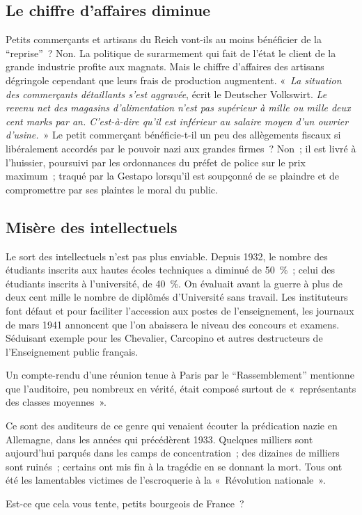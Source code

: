 \documentclass[french,twoside]{book} %
\begin{document}
\subsection[Le chiffre d’affaires diminue]{Le chiffre d’affaires diminue}
\noindent Petits commerçants et artisans du Reich vont-ils au moins bénéficier de la “reprise” ? Non. La politique de surarmement qui fait de l’état le client de la grande industrie profite aux magnats. Mais le chiffre d’affaires des artisans dégringole cependant que leurs frais de production augmentent. « \emph{La situation des commerçants détaillants s’est aggravée}, écrit le Deutscher Volkswirt. \emph{Le revenu net des magasins d’alimentation n’est pas supérieur à mille ou mille deux cent marks par an. C’est-à-dire qu’il est inférieur au salaire moyen d’un ouvrier d’usine.} » Le petit commerçant bénéficie-t-il un peu des allègements fiscaux si libéralement accordés par le pouvoir nazi aux grandes firmes ? Non ; il est livré à l’huissier, poursuivi par les ordonnances du préfet de police sur le prix maximum ; traqué par la Gestapo lorsqu’il est soupçonné de se plaindre et de compromettre par ses plaintes le moral du public.
\subsection[Misère des intellectuels]{Misère des intellectuels}
\noindent Le sort des intellectuels n’est pas plus enviable. Depuis 1932, le nombre des étudiants inscrits aux hautes écoles techniques a diminué de 50 \% ; celui des étudiants inscrits à l’université, de 40 \%. On évaluait avant la guerre à plus de deux cent mille le nombre de diplômés d’Université sans travail. Les instituteurs font défaut et pour faciliter l’accession aux postes de l’enseignement, les journaux de mars 1941 annoncent que l’on abaissera le niveau des concours et examens. Séduisant exemple pour les Chevalier, Carcopino et autres destructeurs de l’Enseignement public français.\par
Un compte-rendu d’une réunion tenue à Paris par le “Rassemblement” mentionne que l’auditoire, peu nombreux en vérité, était composé surtout de « représentants des classes moyennes ».\par
Ce sont des auditeurs de ce genre qui venaient écouter la prédication nazie en Allemagne, dans les années qui précédèrent 1933. Quelques milliers sont aujourd’hui parqués dans les camps de concentration ; des dizaines de milliers sont ruinés ; certains ont mis fin à la tragédie en se donnant la mort. Tous ont été les lamentables victimes de l’escroquerie à la « Révolution nationale ».\par
Est-ce que cela vous tente, petits bourgeois de France ?
\renewcommand{\leftmark}{9 – Ordre nouveau ? Non ! Hégémonie impérialiste.}
\end{document}
